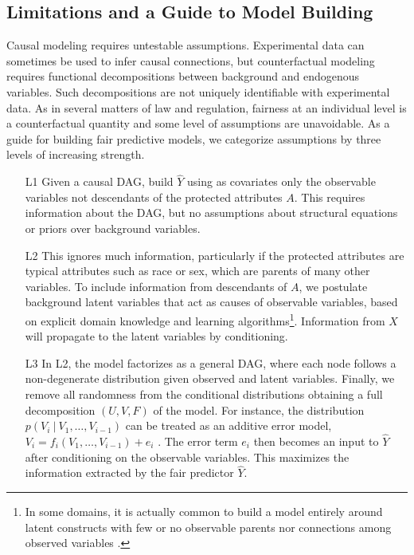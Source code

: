\subsection{Limitations and a Guide to Model Building}
Causal modeling requires untestable assumptions. Experimental data can
sometimes be used to infer causal connections, but counterfactual
modeling requires functional
decompositions between background and endogenous variables.
Such decompositions are not
uniquely identifiable  with experimental data. As in several
matters of law and regulation, fairness at an individual level is a
counterfactual quantity and some level of assumptions
are unavoidable. As a guide for building fair predictive models, we
categorize assumptions by three levels of increasing strength.
%
\begin{itemize}
\item[L1] Given a causal DAG, build $\hat Y$
  using as covariates only the observable variables  not
  descendants of the protected attributes $A$. This
  requires information about the DAG, but no
  assumptions about structural equations or priors over background
  variables. %
\item[L2] This ignores much information, particularly if the protected
  attributes are typical attributes such as race or sex,
  which are parents of many other variables. To include information
  from descendants of $A$, we postulate background latent variables
  that act as causes of observable variables, based on explicit domain
  knowledge and learning algorithms\footnote{In some domains, it is
    actually common to build a model entirely around latent constructs
    with few or no observable parents nor connections among observed
    variables \citep{bol:89}.}. Information from $X$ will propagate to
  the latent variables by conditioning.%
 \item[L3] In L2, the model factorizes as a
   general DAG, where each node follows a non-degenerate
   distribution given observed and latent variables. %
   Finally, we remove all randomness from the conditional
   distributions obtaining a full decomposition $(U, V, F)$ of the
   model. %
   For instance, the  distribution
   $p(V_i\ |\ V_1, \dots, V_{i - 1})$ can be treated as an additive
   error model, $V_i = f_i(V_1, \dots, V_{i - 1}) + e_i$
   \citep{peters:14}. The error term $e_i$  then becomes an input
   to $\hat Y$ after conditioning on the observable variables. This
   maximizes the information  extracted
   by the fair predictor $\hat Y$.
\end{itemize}


